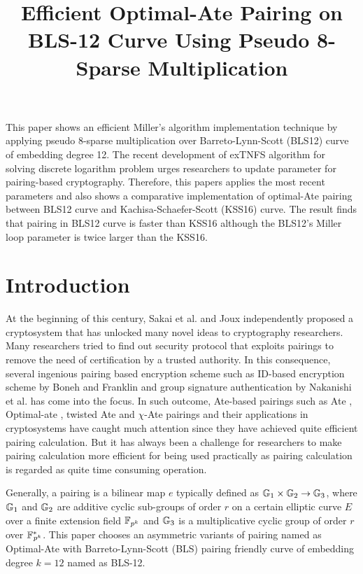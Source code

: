 \title{Efficient Optimal-Ate Pairing on BLS-12 Curve Using Pseudo 8-Sparse Multiplication}

This paper shows an efficient Miller's algorithm implementation technique by applying pseudo 8-sparse multiplication over Barreto-Lynn-Scott (BLS12) curve of embedding degree 12. The recent development of exTNFS algorithm for solving discrete logarithm problem urges researchers to update parameter for pairing-based cryptography. Therefore, this papers applies the most recent parameters and also shows a comparative implementation of optimal-Ate pairing between BLS12 curve and  Kachisa-Schaefer-Scott (KSS16) curve. The result finds that pairing in BLS12 curve is faster than KSS16 although the BLS12's Miller loop parameter is twice larger than the KSS16.


\section{Introduction}
At the beginning of this century, Sakai et al. \cite{sakai2000cryptosystems} and Joux \cite{JC:Joux04} independently proposed a cryptosystem that has unlocked many novel ideas to cryptography researchers. 
Many researchers tried to find out security protocol that exploits pairings to remove the need of certification by a trusted authority. 
In this consequence, several ingenious pairing based encryption scheme such as ID-based encryption scheme by  Boneh and Franklin \cite{sakai2000cryptosystems} and group signature authentication by Nakanishi et al. \cite{AC:NakFun05} has come into the focus. 
In such outcome, Ate-based pairings such as Ate \cite{DBLP:reference/crc/2005ehcc}, Optimal-ate \cite{DBLP:journals/tit/Vercauteren10}, twisted Ate \cite{EPRINT:MKHO07} and $\chi$-Ate \cite{PAIRING:NASKM08} pairings and their applications in cryptosystems have caught much attention since they have achieved quite efficient pairing calculation.
But it has always been a challenge for researchers to make pairing calculation more efficient for being used practically as pairing calculation is regarded as quite time consuming operation. 

Generally, a pairing is a bilinear map $e$ typically defined as  ${\mathbb{G}}_{1} \times {\mathbb{G}}_{2} \to {\mathbb{G}}_{3}$, where ${\mathbb{G}}_{1}$ and ${\mathbb{G}}_{2}$ are additive cyclic sub-groups of  order $r$  on a certain elliptic curve $E$ over a finite extension field $\mathbb{F}_{p^k}$ and ${\mathbb{G}}_{3}$ is a multiplicative cyclic group of order $r$ over ${{\mathbb{F}}^{\ast}}_{\!\!\!p^{k}}$.
This paper chooses an asymmetric variants of pairing named as Optimal-Ate \cite{DBLP:journals/tit/Vercauteren10} with Barreto-Lynn-Scott (BLS) \cite{SCN:BarLynSco02} pairing friendly curve of embedding degree $k=12$ named as BLS-12.

